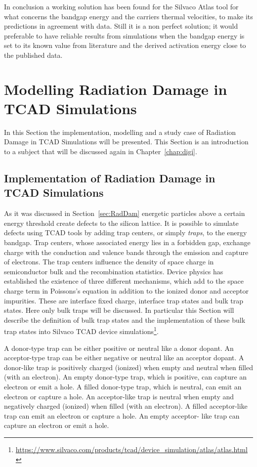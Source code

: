 In conclusion a working solution has been found for the Silvaco Atlas tool  for what concerns the bandgap 
energy and the carriers thermal velocities, to make its predictions in agreement with data. 
Still it is a non perfect solution; it would preferable to have reliable results from simulations
 when the bandgap energy is set to its known value from literature and the derived activation energy close 
 to the published data.


\section{Modelling Radiation Damage in TCAD Simulations}
\label{sec:TCADRadDamage}

In this Section the implementation, modelling and a  study case of Radiation Damage in TCAD 
Simulations will be presented. This Section is an introduction to a subject that will be 
discussed again in  Chapter~\ref{chap:digi}.

\subsection{Implementation of Radiation Damage in TCAD Simulations}
As it was discussed in Section~\ref{sec:RadDam} energetic particles above a certain energy threshold 
create defects to the silicon lattice. 
It is possible to simulate defects using TCAD tools by adding trap centers, or simply {\it traps}, to the 
energy bandgap. 
Trap centers, whose associated energy lies in a forbidden gap, exchange charge with the conduction 
and valence bands through the emission and capture of electrons. The trap centers influence the 
density of space charge in semiconductor bulk and the recombination statistics.
Device physics has established the existence of three different mechanisms, which add to the space 
charge term in Poissons's equation in addition to the ionized donor and acceptor impurities. These are 
interface fixed charge, interface trap states and bulk trap states. Here only bulk traps 
will be discussed. In particular this Section will describe the definition of bulk trap states and the implementation of these bulk trap states into Silvaco TCAD device simulations\footnote{\url{https://www.silvaco.com/products/tcad/device_simulation/atlas/atlas.html}}.

A donor-type trap can be either positive or neutral like a donor dopant. An acceptor-type trap can be 
either negative or neutral like an acceptor dopant. A donor-like trap is positively charged (ionized) when 
empty and neutral when filled (with an electron). An empty donor-type trap, which is positive, can 
capture an electron or emit a hole. A filled donor-type trap, which is neutral, can emit an electron or 
capture a hole. An acceptor-like trap is neutral when empty and negatively charged (ionized) when filled 
(with an electron). A filled acceptor-like trap can emit an electron or capture a hole. An empty acceptor-
like trap can capture an electron or emit a hole. 


